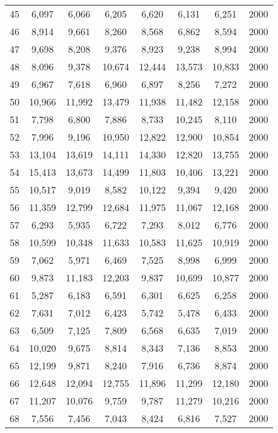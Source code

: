 \begin{longtable}{cccccccc}
45  & 6,097  & 6,066  & 6,205  & 6,620  & 6,131  & 6,251     & 2000 \\
46  & 8,914  & 9,661  & 8,260  & 8,568  & 6,862  & 8,594     & 2000 \\
47  & 9,698  & 8,208  & 9,376  & 8,923  & 9,238  & 8,994     & 2000 \\
48  & 8,096  & 9,378  & 10,674 & 12,444 & 13,573 & 10,833    & 2000 \\
49  & 6,967  & 7,618  & 6,960  & 6,897  & 8,256  & 7,272     & 2000 \\
50  & 10,966 & 11,992 & 13,479 & 11,938 & 11,482 & 12,158    & 2000 \\
51  & 7,798  & 6,800  & 7,886  & 8,733  & 10,245 & 8,110     & 2000 \\
52  & 7,996  & 9,196  & 10,950 & 12,822 & 12,900 & 10,854    & 2000 \\
53  & 13,104 & 13,619 & 14,111 & 14,330 & 12,820 & 13,755    & 2000 \\
54  & 15,413 & 13,673 & 14,499 & 11,803 & 10,406 & 13,221    & 2000 \\
55  & 10,517 & 9,019  & 8,582  & 10,122 & 9,394  & 9,420     & 2000 \\
56  & 11,359 & 12,799 & 12,684 & 11,975 & 11,067 & 12,168    & 2000 \\
57  & 6,293  & 5,935  & 6,722  & 7,293  & 8,012  & 6,776     & 2000 \\
58  & 10,599 & 10,348 & 11,633 & 10,583 & 11,625 & 10,919    & 2000 \\
59  & 7,062  & 5,971  & 6,469  & 7,525  & 8,998  & 6,999     & 2000 \\
60  & 9,873  & 11,183 & 12,203 & 9,837  & 10,699 & 10,877    & 2000 \\
61  & 5,287  & 6,183  & 6,591  & 6,301  & 6,625  & 6,258     & 2000 \\
62  & 7,631  & 7,012  & 6,423  & 5,742  & 5,478  & 6,433     & 2000 \\
63  & 6,509  & 7,125  & 7,809  & 6,568  & 6,635  & 7,019     & 2000 \\
64  & 10,020 & 9,675  & 8,814  & 8,343  & 7,136  & 8,853     & 2000 \\
65  & 12,199 & 9,871  & 8,240  & 7,916  & 6,736  & 8,874     & 2000 \\
66  & 12,648 & 12,094 & 12,755 & 11,896 & 11,299 & 12,180    & 2000 \\
67  & 11,207 & 10,076 & 9,759  & 9,787  & 11,279 & 10,216    & 2000 \\
68  & 7,556  & 7,456  & 7,043  & 8,424  & 6,816  & 7,527     & 2000 \\

\end{longtable}
